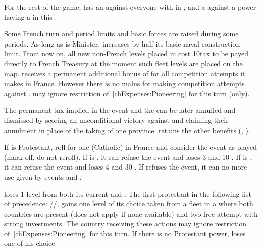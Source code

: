\phdipl
\aparag For the rest of the game, \FRA has an \OCB against everyone with
\TradeFLEET in , and a \CB against a power having a
\TradeFLEET\faceplus in this \CTZ.

\phadm
\aparag\label{pV:Colbert:limits} Some French turn and period limits and basic
forces are raised during some periods.
\aparag As long as \ministreColbert is Minister, \FRA increases by half its
basic naval construction limit.
\aparag From now on, all new non-French \TradeFLEET levels placed in
 cost 10\ducats tax to be payed directly to French Treasury at the
moment such fleet levels are placed on the map.
\aparag\label{pV:Colbert:CB} \FRA receives a permanent additional bonus of
 for all competition attempts it makes in \CTZ France. However there
is no malus for making competition attempts against \FRA.
\aparag \FRA may ignore restriction of~\ref{chExpenses:Pioneering} for this
turn (only).

\phpaix
\aparag The permanent tax implied in the event and the \CB can be later
annulled and \ministreColbert dismissed by scoring an unconditional victory
against \FRA and claiming their annulment in place of the taking of one
province. \FRA retains the other benefits (,
).





\condition{}
\aparag If \FRA is Protestant, roll for one (Catholic) \REVOLT in France and
consider the event as played (mark off, do not reroll).
\aparag If \FRA is \CATHCO, it can refuse the event and loses 3 \STAB and 10
\PV.
\aparag If \FRA is \CATHCR, it can refuse the event and loses 4 \STAB and 30
\PV.
\aparag If \FRA refuses the event, it can no more use \CB given by events
 and .

\phevnt
\aparag \FRA loses 1 level from both its current \FTI and \DTI.
\aparag The first protestant in the following list of precedence:
\HOL/\ENG/\SUE, gains one \TradeFLEET level of its choice taken from a
\TradeFLEET fleet in a \STZ where both countries are present (does not apply
if none available) and two free \COL attempt with strong investments.
\bparag The country receiving these actions may ignore restriction
of~\ref{chExpenses:Pioneering} for this turn.
\bparag If there is no Protestant power, \FRA loses one \TradeFLEET of his
choice.



